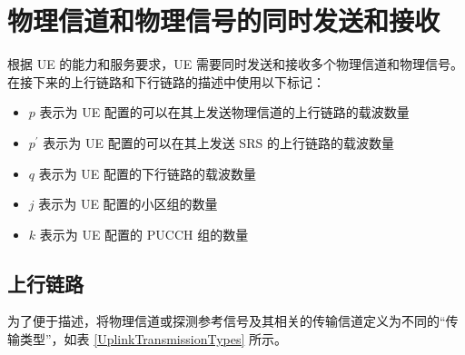 \documentclass[cn,hazy,blue,14pt,screen,device=normal]{elegantnote}
\begin{document}
\section{物理信道和物理信号的同时发送和接收}
根据 UE 的能力和服务要求，UE 需要同时发送和接收多个物理信道和物理信号。在接下来的上行链路和下行链路的描述中使用以下标记：
\begin{itemize}[leftmargin=2cm]
	\item $p$ 表示为 UE 配置的可以在其上发送物理信道的上行链路的载波数量
	\item $p^{'}$ 表示为 UE 配置的可以在其上发送 SRS 的上行链路的载波数量
	\item $q$ 表示为 UE 配置的下行链路的载波数量
	\item $j$ 表示为 UE 配置的小区组的数量
	\item $k$ 表示为 UE 配置的 PUCCH 组的数量
\end{itemize}

\subsection{上行链路}
为了便于描述，将物理信道或探测参考信号及其相关的传输信道定义为不同的“传输类型”，如表 \ref{UplinkTransmissionTypes} 所示。
\begin{table}[!htbp]
	\centering

	\caption{上行链路传输类型}
	\label{UplinkTransmissionTypes}
\end{table}
\end{document}
